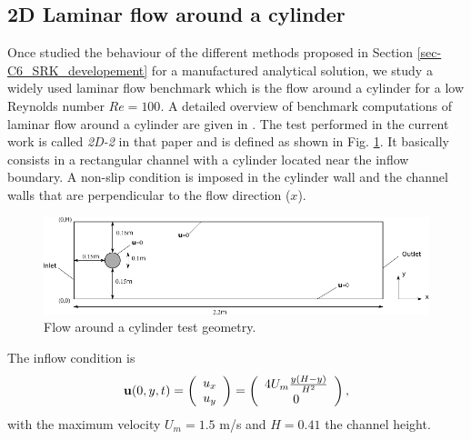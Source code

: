\subsection{2D Laminar flow around a cylinder}
\label{subsec-C6_cylinder}
Once studied the behaviour of the different methods proposed in Section \ref{sec-C6_SRK_developement} for a manufactured analytical solution, we study a widely used laminar flow benchmark which is the flow around a cylinder for a low Reynolds number $Re=100$. A detailed overview of benchmark computations of laminar flow around a cylinder are given in \cite{schafer_benchmark_1996}. The test performed in the current work is called \textit{2D-2} in that paper and is defined as shown in Fig. \ref{fig:Cyl_geom}. It basically consists in a rectangular channel with a cylinder located near the inflow boundary. A non-slip condition is imposed in the cylinder wall and the channel walls that are perpendicular to the flow direction ($x$).
\begin{figure}[h!]
  \centering
  \includegraphics[width=\textwidth]{Figures/Chapter6/geom_2D} 
  \caption{Flow around a cylinder test geometry.}
  \label{fig:Cyl_geom}
\end{figure}
The inflow condition is
$${\bf u}(0,y,t)=\left(\begin{array}{c}
u_x\\
u_y\\
\end{array}\right)=\left(\begin{array}{c}
4U_m\frac{y(H-y)}{H^2}\\
0\\
\end{array}\right),$$
with the maximum velocity $U_m=1.5$ m/s and $H=0.41$ the channel height.

